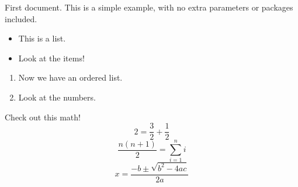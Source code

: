 \documentclass{article}
\begin{document}
First document. This is a simple example, with no 
extra parameters or packages included.

\begin{itemize}
    \item This is a list.
    \item Look at the items!
\end{itemize}

\begin{enumerate}
    \item Now we have an ordered list.
    \item Look at the numbers.
\end{enumerate}

Check out this math!
$$ 2 = \frac{3}{2} + \frac{1}{2} $$
$$ \frac{n(n+1)}{2} = \sum_{i=1}^{n} i $$
$$ x = \frac{-b \pm \sqrt{b^2 - 4ac}}{2a} $$
\end{document}
